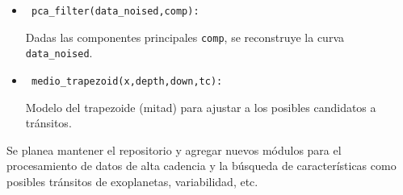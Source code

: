 \begin{itemize}
	\item \begin{verbatim} pca_filter(data_noised,comp): \end{verbatim} Dadas las componentes principales \texttt{comp}, se reconstruye la curva \texttt{data\_noised}.
	\item \begin{verbatim} medio_trapezoid(x,depth,down,tc): \end{verbatim} Modelo del trapezoide (mitad) para ajustar a los posibles candidatos a tránsitos.
\end{itemize}

Se planea mantener el repositorio y agregar nuevos módulos para el procesamiento de datos de alta cadencia y la búsqueda de características como posibles tránsitos de exoplanetas, variabilidad, etc.